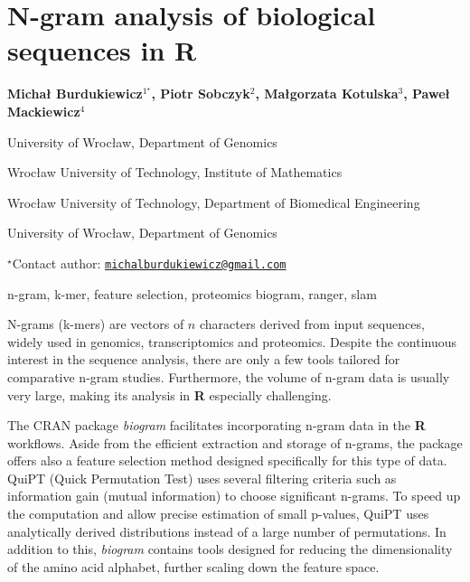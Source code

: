 \documentclass[doc.tex]{subfiles}
\begin{document}
\pagestyle{empty}

\section{N-gram analysis of biological sequences in R}

\begin{center}
  {\bf Michał Burdukiewicz$^{1^\star}$, Piotr Sobczyk$^{2}$, Małgorzata Kotulska$^{3}$, Paweł Mackiewicz$^{4}$}
\end{center}

\vskip 0.3cm

\begin{affiliations}
\begin{enumerate}
\begin{minipage}{0.915\textwidth}
\centering
\item University of Wrocław, Department of Genomics \\[-2pt]
\item Wrocław University of Technology, Institute of Mathematics \\[-2pt]
\item Wrocław University of Technology, Department of Biomedical Engineering \\[-2pt]
\item University of Wrocław, Department of Genomics \\[-2pt]
\end{minipage}
\end{enumerate}
$^\star$Contact author: \href{mailto:michalburdukiewicz@gmail.com}{\nolinkurl{michalburdukiewicz@gmail.com}}\\
\end{affiliations}

\vskip 0.5cm

\begin{minipage}{0.915\textwidth}
\keywords n-gram, k-mer, feature selection, proteomics
\packages biogram, ranger, slam
\end{minipage}

\vskip 0.8cm

N-grams (k-mers) are vectors of \(n\) characters derived from input
sequences, widely used in genomics, transcriptomics and proteomics.
Despite the continuous interest in the sequence analysis, there are only
a few tools tailored for comparative n-gram studies. Furthermore, the
volume of n-gram data is usually very large, making its analysis in
\textbf{R} especially challenging.

The CRAN package \emph{biogram} facilitates incorporating n-gram data in
the \textbf{R} workflows. Aside from the efficient extraction and
storage of n-grams, the package offers also a feature selection method
designed specifically for this type of data. QuiPT (Quick Permutation
Test) uses several filtering criteria such as information gain (mutual
information) to choose significant n-grams. To speed up the computation
and allow precise estimation of small p-values, QuiPT uses analytically
derived distributions instead of a large number of permutations. In
addition to this, \emph{biogram} contains tools designed for reducing
the dimensionality of the amino acid alphabet, further scaling down the
feature space.
\end{document}
